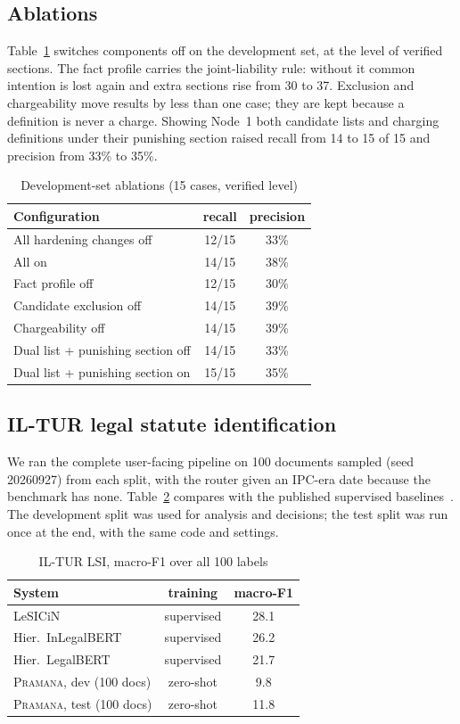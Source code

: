 \documentclass[conference]{IEEEtran}
\newcommand{\sys}{\textsc{Pramana}\xspace}
\newcommand{\testmacro}{11.8}
\begin{document}
\subsection{Ablations}
Table~\ref{tab:abl} switches components off on the development set, at the level of verified sections. The fact profile carries the joint-liability rule: without it common intention is lost again and extra sections rise from 30 to 37. Exclusion and chargeability move results by less than one case; they are kept because a definition is never a charge. Showing Node~1 both candidate lists and charging definitions under their punishing section raised recall from 14 to 15 of 15 and precision from 33\% to 35\%.

\begin{table}[t]
\caption{Development-set ablations (15 cases, verified level)}
\label{tab:abl}
\centering
\begin{tabular}{lcc}
\toprule
Configuration & recall & precision\\
\midrule
All hardening changes off & 12/15 & 33\%\\
All on & 14/15 & 38\%\\
Fact profile off & 12/15 & 30\%\\
Candidate exclusion off & 14/15 & 39\%\\
Chargeability off & 14/15 & 39\%\\
\midrule
Dual list + punishing section off & 14/15 & 33\%\\
Dual list + punishing section on & 15/15 & 35\%\\
\bottomrule
\end{tabular}
\end{table}

\subsection{IL-TUR legal statute identification}
We ran the complete user-facing pipeline on 100 documents sampled (seed 20260927) from each split, with the router given an IPC-era date because the benchmark has none. Table~\ref{tab:iltur} compares with the published supervised baselines~\cite{iltur}. The development split was used for analysis and decisions; the test split was run once at the end, with the same code and settings.

\begin{table}[t]
\caption{IL-TUR LSI, macro-F1 over all 100 labels}
\label{tab:iltur}
\centering
\begin{tabular}{lcc}
\toprule
System & training & macro-F1\\
\midrule
LeSICiN~\cite{lesicin} & supervised & 28.1\\
Hier.\ InLegalBERT & supervised & 26.2\\
Hier.\ LegalBERT & supervised & 21.7\\
\sys, dev (100 docs) & zero-shot & 9.8\\
\sys, test (100 docs) & zero-shot & \testmacro\\
\bottomrule
\end{tabular}
\end{table}
\end{document}
